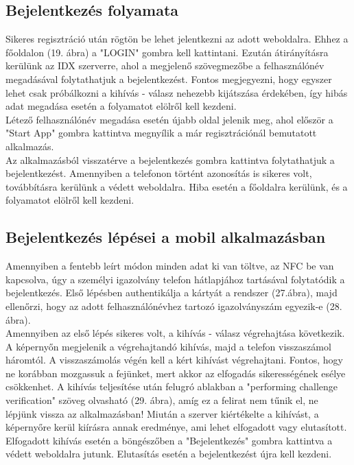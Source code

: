 \subsection{Bejelentkezés folyamata}
Sikeres regisztráció után rögtön be lehet jelentkezni az adott weboldalra. Ehhez a főoldalon (19. ábra) a "LOGIN" gombra kell kattintani. Ezután átirányításra kerülünk az IDX szerverre, ahol a megjelenő szövegmezőbe a felhasználónév megadásával folytathatjuk a bejelentkezést. Fontos megjegyezni, hogy egyszer lehet csak próbálkozni a kihívás - válasz nehezebb kijátszása érdekében, így hibás adat megadása esetén a folyamatot elölről kell kezdeni.
\\Létező felhasználónév megadása esetén újabb oldal jelenik meg, ahol először a "Start App" gombra kattintva megnyílik a már regisztrációnál bemutatott alkalmazás.
\\Az alkalmazásból visszatérve a bejelentkezés gombra kattintva folytathatjuk a bejelentkezést. Amennyiben a telefonon történt azonosítás is sikeres volt, továbbításra kerülünk a védett weboldalra. Hiba esetén a főoldalra kerülünk, és a folyamatot elölről kell kezdeni.


\subsection{Bejelentkezés lépései a mobil alkalmazásban}
Amennyiben a fentebb leírt módon minden adat ki van töltve, az NFC be van kapcsolva, úgy a személyi igazolvány telefon hátlapjához tartásával folytatódik a bejelentkezés. Első lépésben authentikálja a kártyát a rendszer (27.ábra), majd ellenőrzi, hogy az adott felhasználónévhez tartozó igazolványszám egyezik-e (28. ábra).
\\Amennyiben az első lépés sikeres volt, a kihívás - válasz végrehajtása következik. A képernyőn megjelenik a végrehajtandó kihívás, majd a telefon visszaszámol háromtól. A visszaszámolás végén kell a kért kihívást végrehajtani. Fontos, hogy ne korábban mozgassuk a fejünket, mert akkor az elfogadás sikerességének esélye csökkenhet.
A kihívás teljesítése után felugró ablakban a "performing challenge verification" szöveg olvasható (29. ábra), amíg ez a felirat nem tűnik el, ne lépjünk vissza az alkalmazásban! Miután a szerver kiértékelte a kihívást, a képernyőre kerül kiírásra annak eredménye, ami lehet elfogadott vagy elutasított. Elfogadott kihívás esetén a böngészőben a "Bejelentkezés" gombra kattintva a védett weboldalra jutunk. Elutasítás esetén a bejelentkezést újra kell kezdeni.

